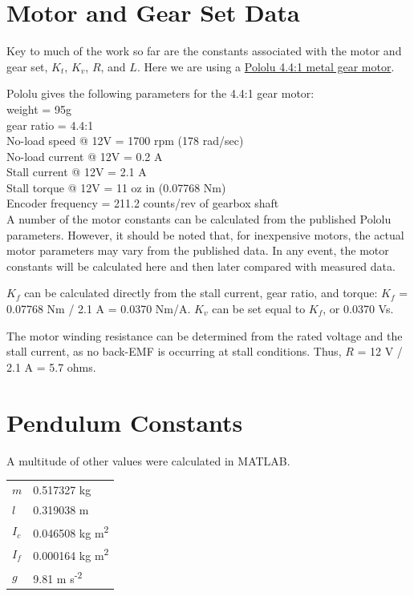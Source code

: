 \documentclass[12pt,letterpaper]{article}
\begin{document}
\begin{appendices}

\section{Motor and Gear Set Data}

Key to much of the work so far are the constants associated with the motor and gear set, $K_{t}$, $K_{v}$, $R$, and $L$.
Here we are using a \href{https://www.pololu.com/product/3237}{Pololu  4.4:1 metal gear motor}.  

Pololu gives the following parameters for the 4.4:1 gear motor: \\
weight = 95g \\
gear ratio = 4.4:1 \\
No-load speed @ 12V = 1700 rpm (178 rad/sec)\\
No-load current @ 12V = 0.2 A \\
Stall current @ 12V = 2.1 A \\
Stall torque @ 12V = 11 oz in (0.07768 Nm)\\
Encoder frequency = 211.2 counts/rev of gearbox shaft\\

A number of the motor constants can be calculated from the published Pololu parameters.  However, it
should  be noted that, for inexpensive motors, the actual motor parameters may vary from the 
published data.  In any event, the motor constants will be calculated here and then later compared
with measured data.

$K_{f}$ can be calculated directly from the stall current, gear ratio, and torque: $K_{f}$ = 0.07768 Nm /  2.1 A = 
0.0370 Nm/A.  $K_{v}$ can be set equal to $K_{f}$, or 0.0370 Vs.

The motor winding resistance can be determined from the rated voltage and the stall current, as no back-EMF is occurring at stall
conditions.  Thus, $R$ = 12 V / 2.1 A = 5.7 ohms.



\section{Pendulum Constants}
A multitude of other values were calculated in MATLAB.  \\

\begin{tabular}{l l}
$m$ & 0.517327 kg \\
$l$ & 0.319038 m \\
$I_{c}$ & 0.046508 kg m\textsuperscript{2} \\
$I_{f}$ & 0.000164 kg m\textsuperscript{2} \\
$g$ & 9.81 m s\textsuperscript{-2} \\
\end{tabular}





\end{appendices}
\end{document}
